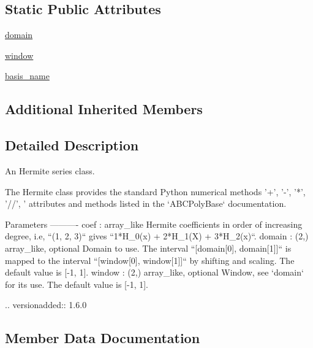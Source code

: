 \subsection*{Static Public Attributes}
\begin{DoxyCompactItemize}
\item 
\hyperlink{classnumpy_1_1polynomial_1_1hermite_1_1Hermite_a60cdf1d187fa085719a2ec6a1d2321cb}{domain}
\item 
\hyperlink{classnumpy_1_1polynomial_1_1hermite_1_1Hermite_a98d5e5be53039276a73b423ea6fa0af3}{window}
\item 
\hyperlink{classnumpy_1_1polynomial_1_1hermite_1_1Hermite_aec7d2e48029f435d391a12687762c694}{basis\+\_\+name}
\end{DoxyCompactItemize}
\subsection*{Additional Inherited Members}


\subsection{Detailed Description}
\begin{DoxyVerb}An Hermite series class.

The Hermite class provides the standard Python numerical methods
'+', '-', '*', '//', '%
attributes and methods listed in the `ABCPolyBase` documentation.

Parameters
----------
coef : array_like
    Hermite coefficients in order of increasing degree, i.e,
    ``(1, 2, 3)`` gives ``1*H_0(x) + 2*H_1(X) + 3*H_2(x)``.
domain : (2,) array_like, optional
    Domain to use. The interval ``[domain[0], domain[1]]`` is mapped
    to the interval ``[window[0], window[1]]`` by shifting and scaling.
    The default value is [-1, 1].
window : (2,) array_like, optional
    Window, see `domain` for its use. The default value is [-1, 1].

    .. versionadded:: 1.6.0\end{DoxyVerb}
 

\subsection{Member Data Documentation}
\mbox{\label{classnumpy_1_1polynomial_1_1hermite_1_1Hermite_aec7d2e48029f435d391a12687762c694}} 
